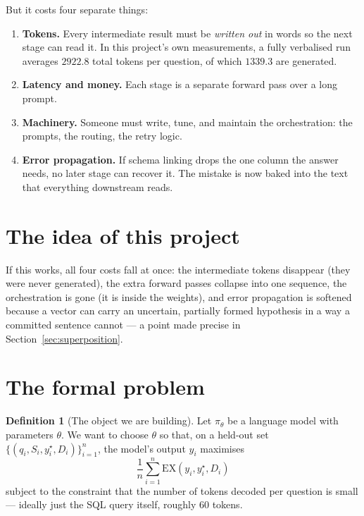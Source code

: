 \documentclass[11pt]{article}
\theoremstyle{definition}
\newtheorem{definition}[theorem]{Definition}
\begin{document}
But it costs four separate things:

\begin{enumerate}
\item \textbf{Tokens.} Every intermediate result must be \emph{written out} in words so the next stage can read it. In this project's own measurements, a fully verbalised run averages $2922.8$ total tokens per question, of which $1339.3$ are generated.
\item \textbf{Latency and money.} Each stage is a separate forward pass over a long prompt.
\item \textbf{Machinery.} Someone must write, tune, and maintain the orchestration: the prompts, the routing, the retry logic.
\item \textbf{Error propagation.} If schema linking drops the one column the answer needs, no later stage can recover it. The mistake is now baked into the text that everything downstream reads.
\end{enumerate}

\section{The idea of this project}

\begin{center}
\end{center}

If this works, all four costs fall at once: the intermediate tokens disappear (they were never generated), the extra forward passes collapse into one sequence, the orchestration is gone (it is inside the weights), and error propagation is softened because a vector can carry an uncertain, partially formed hypothesis in a way a committed sentence cannot --- a point made precise in Section~\ref{sec:superposition}.

\section{The formal problem}

\begin{definition}[The object we are building]
Let $\pi_\theta$ be a language model with parameters $\theta$. We want to choose $\theta$ so that, on a held-out set $\{(q_i, S_i, y^\star_i, D_i)\}_{i=1}^n$, the model's output $y_i$ maximises
\[
\frac{1}{n}\sum_{i=1}^{n}\mathrm{EX}(y_i, y^\star_i, D_i)
\]
subject to the constraint that the number of tokens decoded per question is small --- ideally just the SQL query itself, roughly $60$ tokens.
\end{definition}
\end{document}
